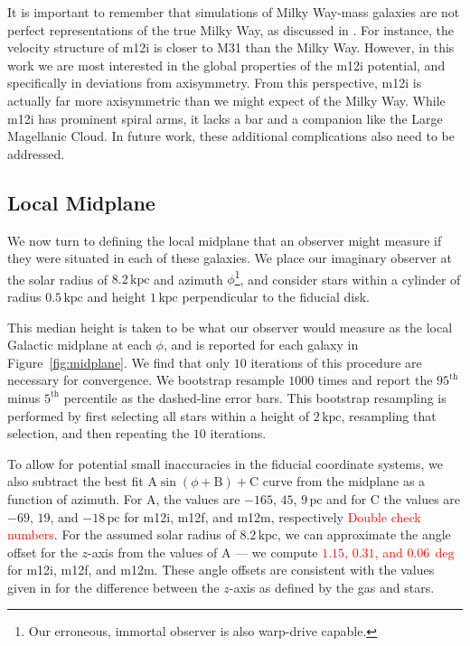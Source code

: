 \documentclass[twocolumn]{aastex62}
\newcommand{\Gus}[1]{\textcolor{red}{#1}}
\newcommand{\pc}{\text{pc}}
\newcommand{\kpc}{\text{kpc}}
\begin{document}

It is important to remember that simulations of Milky Way-mass galaxies are
not perfect representations of the true Milky Way, as discussed in
\citet{2018arXiv180610564S}. For instance, the velocity structure of m12i is
closer to M31 than the Milky Way. However, in this work we are most interested
in the global properties of the m12i potential, and specifically in deviations
from axisymmetry. From this perspective, m12i is actually far more
axisymmetric than we might expect of the Milky Way. While m12i has prominent
spiral arms, it lacks a bar and a companion like the Large Magellanic Cloud.
In future work, these additional complications also need to be addressed.

\subsection{Local Midplane} \label{sec:local_midplane}
We now turn to defining the local midplane that an observer might measure if
they were situated in each of these galaxies. We place our imaginary observer
at the solar radius of $8.2\,\kpc$ and azimuth $\phi$\footnote{Our erroneous,
immortal observer is also warp-drive capable.}, and consider stars within a
cylinder of radius $0.5\,\kpc$ and height $1\,\kpc$ perpendicular to the
fiducial disk.

This median height is taken to be what our observer would measure as the local
Galactic midplane at each $\phi$, and is reported for each galaxy in
Figure~\ref{fig:midplane}. We find that only $10$ iterations of this procedure
are necessary for convergence. We bootstrap resample $1000$ times and report
the $95^{\text{th}}$ minus $5^{\text{th}}$ percentile as the dashed-line error
bars. This bootstrap resampling is performed by first selecting all stars
within a height of $2\,\kpc$, resampling that selection, and then repeating
the $10$ iterations.

To allow for potential small inaccuracies in the fiducial coordinate systems,
we also subtract the best fit $\text{A} \sin{\left(\phi + \text{B}\right)} +
\text{C}$ curve from the midplane as a function of azimuth. For $\text{A}$,
the values are $-165$, $45$, $9\,\pc$ and for $\text{C}$ the values are $-69$,
$19$, and $-18\,\pc$ for m12i, m12f, and m12m, respectively \Gus{Double check
numbers}. For the assumed solar radius of $8.2\,\kpc$, we can approximate the
angle offset for the $z$-axis from the values of $\text{A}$ --- we compute
\Gus{$1.15$, $0.31$, and $0.06\,\deg$} for m12i, m12f, and m12m. These angle
offsets are consistent with the values given in \citet{2018arXiv180610564S}
for the difference between the $z$-axis as defined by the gas and stars.
\end{document}
